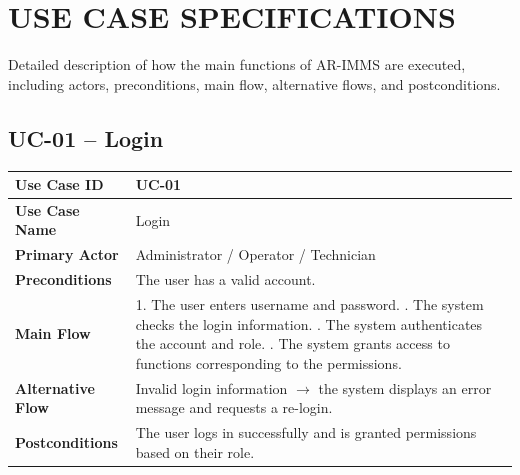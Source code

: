 \section{USE CASE SPECIFICATIONS}\label{s:use_case_specifications}

Detailed description of how the main functions of AR-IMMS are executed, including actors, preconditions, main flow, alternative flows, and postconditions.

\subsection*{UC-01 -- Login}
\noindent
\begin{tabularx}{\textwidth}{|>{\bfseries}p{3.2cm}|X|}
\hline
Use Case ID & UC-01 \\ \hline
Use Case Name & Login \\ \hline
Primary Actor & Administrator / Operator / Technician \\ \hline
Preconditions & The user has a valid account. \\ \hline
Main Flow & 1. The user enters username and password. \newline
2. The system checks the login information. \newline
3. The system authenticates the account and role. \newline
4. The system grants access to functions corresponding to the permissions. \\ \hline
Alternative Flow & Invalid login information $\rightarrow$ the system displays an error message and requests a re-login. \\ \hline
Postconditions & The user logs in successfully and is granted permissions based on their role. \\ \hline
\end{tabularx}

\vspace{1.5em}

